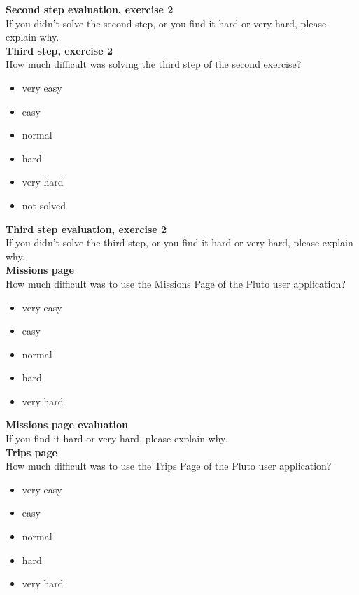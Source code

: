 \textbf{Second step evaluation, exercise 2}
\\

If you didn't solve the second step, or you find it hard or very hard, please explain why.
\\ 

\textbf{Third step, exercise 2}
\\

How much difficult was solving the third step of the second exercise?


\begin{itemize}
\item{very easy}
\item{easy}
\item{normal}
\item{hard}
\item{very hard}
\item{not solved}

\end{itemize}

\textbf{Third step evaluation, exercise 2}
\\

If you didn't solve the third step, or you find it hard or very hard, please explain why.
\\ 

\textbf{Missions page}
\\

How much difficult was to use the Missions Page of the Pluto user application?


\begin{itemize}
\item{very easy}
\item{easy}
\item{normal}
\item{hard}
\item{very hard}

\end{itemize}

\textbf{Missions page evaluation}
\\

If you find it hard or very hard, please explain why.
\\ 

\textbf{Trips page}
\\

How much difficult was to use the Trips Page of the Pluto user application?


\begin{itemize}
\item{very easy}
\item{easy}
\item{normal}
\item{hard}
\item{very hard}

\end{itemize}

